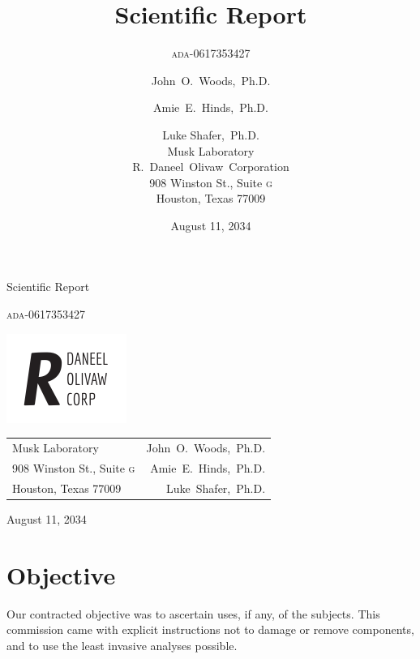\documentclass[10pt,twoside,openany]{article}
\title{Scientific Report}
\subtitle{\textsc{ada}-0617353427}
\author{
        John~O.~Woods,~Ph.D. \\
            \and
        Amie~E.~Hinds,~Ph.D. \\
            \and
        Luke Shafer,~Ph.D. \\
        Musk Laboratory\\
        R.~Daneel~Olivaw~Corporation\\
        908 Winston St., Suite \textsc{g} \\
        Houston, Texas 77009
}
\date{August 11, 2034}
\theoremstyle{definition}
\begin{document}
\begin{titlepage}
\centering
{}
\vspace*{\fill}
{\LARGE Scientific Report \par}
{\Large \textsc{ada}-0617353427 \par}
\vspace*{\fill}
\end{titlepage}
\newpage

\hspace*{-0.46in}\vspace*{-0.25in}
\includegraphics[scale=1.5]{r_daneel_olivaw.pdf}
\begin{table}[H]
\begin{tabularx}{1.0\linewidth}{@{}Xr@{}}
	Musk Laboratory & John~O.~Woods,~Ph.D.\\
        908 Winston St., Suite \textsc{g} & Amie~E.~Hinds,~Ph.D.\\
        Houston, Texas 77009 & Luke~Shafer,~Ph.D.\\
\end{tabularx}
\end{table}
\vspace{1em}
\noindent August 11, 2034
\thispagestyle{empty}
\vfill
\newpage




\section{Objective}
Our contracted objective was to ascertain uses, if any, of the subjects.
This commission came with explicit instructions not to damage or remove components, and to use the least invasive analyses possible.
\end{document}
